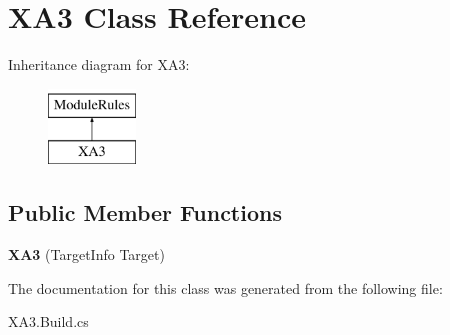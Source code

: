 \hypertarget{class_x_a3}{}\section{X\+A3 Class Reference}
\label{class_x_a3}
Inheritance diagram for X\+A3\+:\begin{figure}[H]
\begin{center}
\leavevmode
\includegraphics[height=2.000000cm]{class_x_a3}
\end{center}
\end{figure}
\subsection*{Public Member Functions}
\begin{DoxyCompactItemize}
\item 
\hypertarget{class_x_a3_a496c0d3cc1ba6008bc8ecd28d2e53f6f}{}\label{class_x_a3_a496c0d3cc1ba6008bc8ecd28d2e53f6f} 
{\bfseries X\+A3} (Target\+Info Target)
\end{DoxyCompactItemize}


The documentation for this class was generated from the following file\+:\begin{DoxyCompactItemize}
\item 
X\+A3.\+Build.\+cs\end{DoxyCompactItemize}
